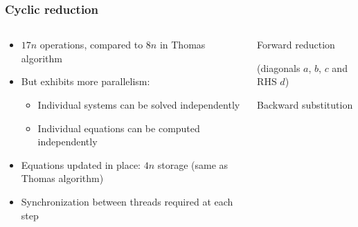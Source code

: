 \begin{frame}
\frametitle{Cyclic reduction}
\begin{columns}
\begin{column}{0.5\textwidth}
\begin{itemize}
\item $17n$ operations,
    compared to $8n$ in Thomas algorithm
\item But exhibits more parallelism:
\begin{itemize}
    \item Individual systems can be solved independently
    \item Individual equations can be computed independently
\end{itemize}
\item Equations updated in place: $4n$ storage (same as Thomas algorithm)
\item Synchronization between threads required at each step
\end{itemize}
\end{column}
\begin{column}{0.5\textwidth}
\centering
Forward reduction

(diagonals $a$, $b$, $c$ and RHS $d$)

\centering
Backward substitution
\end{column}
\end{columns}
\end{frame}


